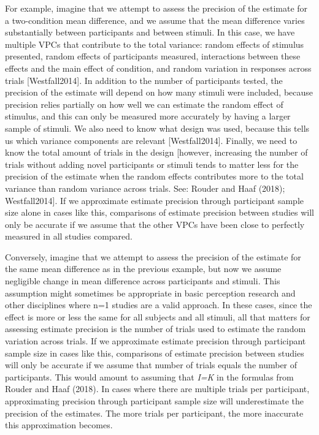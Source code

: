 \documentclass[]{article}
\begin{document}
For example, imagine that we attempt to assess the precision of the
estimate for a two-condition mean difference, and we assume that the
mean difference varies substantially between participants and between
stimuli. In this case, we have multiple VPCs that contribute to the
total variance: random effects of stimulus presented, random effects of
participants measured, interactions between these effects and the main
effect of condition, and random variation in responses across trials
{[}Westfall2014{]}. In addition to the number of participants tested,
the precision of the estimate will depend on how many stimuli were
included, because precision relies partially on how well we can estimate
the random effect of stimulus, and this can only be measured more
accurately by having a larger sample of stimuli. We also need to know
what design was used, because this tells us which variance components
are relevant {[}Westfall2014{]}. Finally, we need to know the total
amount of trials in the design {[}however, increasing the number of
trials without adding novel participants or stimuli tends to matter less
for the precision of the estimate when the random effects contributes
more to the total variance than random variance across trials. See:
Rouder and Haaf (2018); Westfall2014{]}. If we approximate estimate
precision through participant sample size alone in cases like this,
comparisons of estimate precision between studies will only be accurate
if we assume that the other VPCs have been close to perfectly measured
in all studies compared.

Conversely, imagine that we attempt to assess the precision of the
estimate for the same mean difference as in the previous example, but
now we assume negligible change in mean difference across participants
and stimuli. This assumption might sometimes be appropriate in basic
perception research and other disciplines where n=1 studies are a valid
approach. In these cases, since the effect is more or less the same for
all subjects and all stimuli, all that matters for assessing estimate
precision is the number of trials used to estimate the random variation
across trials. If we approximate estimate precision through participant
sample size in cases like this, comparisons of estimate precision
between studies will only be accurate if we assume that number of trials
equals the number of participants. This would amount to assuming that
\emph{I=K} in the formulas from Rouder and Haaf (2018). In cases where
there are multiple trials per participant, approximating precision
through participant sample size will underestimate the precision of the
estimates. The more trials per participant, the more inaccurate this
approximation becomes.
\end{document}
